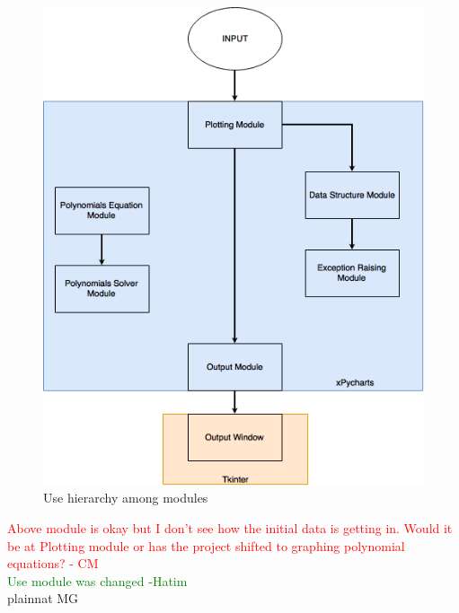 \documentclass[12pt, titlepage]{article}
\begin{document}
\begin{figure}[H]
\centering
\caption{Use hierarchy among modules}
\label{FigUH}
\begin{center}
	\includegraphics[width=\linewidth]{Images/useDiag.png}
\end{center}
\end{figure}
\textcolor{red}{Above module is okay but I don't see how the initial data is getting in. Would it be at Plotting module or has the project shifted to graphing polynomial equations? - CM} \\
\textcolor{green}{Use module was changed -Hatim} \\

 {plainnat}
 {MG}
\end{document}
